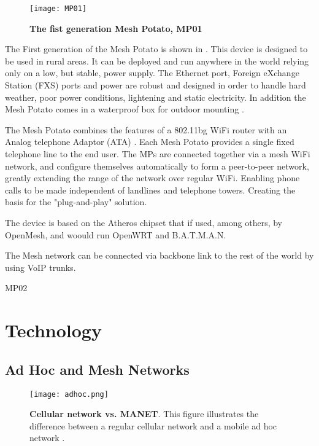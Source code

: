 \begin{figure}[h!]
  \centering
      \texttt{[image: MP01]}
  \caption [The Mesh Potato]{\textbf{The fist generation Mesh Potato, MP01}}
  \label{fig:MP01}
\end{figure}

The First generation of the Mesh Potato is shown in . This device is designed to be used in rural areas. It can be deployed and run anywhere in the world relying only on a low, but stable, power supply. The Ethernet port, Foreign eXchange Station (FXS) ports and power are robust and designed in order to handle hard weather, poor power conditions, lightening and static electricity. In addition the Mesh Potato comes in a waterproof box for outdoor mounting \cite{background}.

The Mesh Potato combines the features of a 802.11bg WiFi router with an Analog telephone Adaptor (ATA) \cite{MP}. Each Mesh Potato provides a single fixed telephone line to the end user. The MPs are connected together via a mesh WiFi network, and  configure themselves automatically to form a peer-to-peer network, greatly extending the range of the network over regular WiFi. Enabling phone calls to be made independent of landlines and telephone towers. Creating the basis for the "plug-and-play" solution. 

The device is based on the Atheros chipset that if used, among others, by OpenMesh, and woould run OpenWRT and B.A.T.M.A.N.







The Mesh network can be connected via backbone link to the rest of the world by using VoIP trunks. 


MP02





\section{Technology}

\subsection{Ad Hoc and Mesh Networks}

\begin{figure}[h!]
  \centering
    \texttt{[image: adhoc.png]}
     \caption [Cellular network vs. MANET]{\textbf{Cellular network vs. MANET}. This figure illustrates the difference between a regular cellular network and a mobile ad hoc network \cite{adhoc2}.}
\label{fig:adhoc}
\end{figure}

